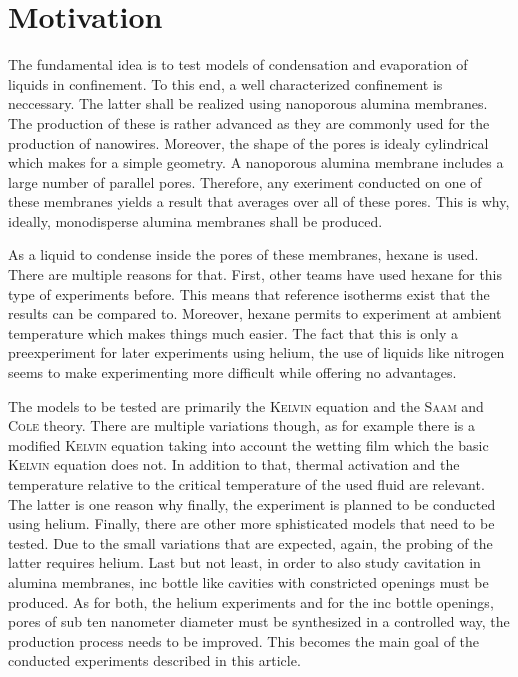 \documentclass[../thesis.tex]{subfiles}
\begin{document}
    \section{Motivation}

      The fundamental idea is to test models of condensation and evaporation of liquids in confinement. To this end, a well characterized confinement is neccessary. The latter shall be realized using nanoporous alumina membranes. The production of these is rather advanced as they are commonly used for the production of nanowires. Moreover, the shape of the pores is idealy cylindrical which makes for a simple geometry. A nanoporous alumina membrane includes a large number of parallel pores. Therefore, any exeriment conducted on one of these membranes yields a result that averages over all of these pores. This is why, ideally, monodisperse alumina membranes shall be produced.

      As a liquid to condense inside the pores of these membranes, hexane is used. There are multiple reasons for that. First, other teams have used hexane for this type of experiments before. This means that reference isotherms exist that the results can be compared to. Moreover, hexane permits to experiment at ambient temperature which makes things much easier. The fact that this is only a preexperiment for later experiments using helium, the use of liquids like nitrogen seems to make experimenting more difficult while offering no advantages.

      The models to be tested are primarily the \textsc{Kelvin} equation and the \textsc{Saam} and \textsc{Cole} theory. There are multiple variations though, as for example there is a modified \textsc{Kelvin} equation taking into account the wetting film which the basic \textsc{Kelvin} equation does not. In addition to that, thermal activation and the temperature relative to the critical temperature of the used fluid are relevant. The latter is one reason why finally, the experiment is planned to be conducted using helium. Finally, there are other more sphisticated models that need to be tested. Due to the small variations that are expected, again, the probing of the latter requires helium. Last but not least, in order to also study cavitation in alumina membranes, inc bottle like cavities with constricted openings must be produced. As for both, the helium experiments and for the inc bottle openings, pores of sub ten nanometer diameter must be synthesized in a controlled way, the production process needs to be improved. This becomes the main goal of the conducted experiments described in this article.
\end{document}
